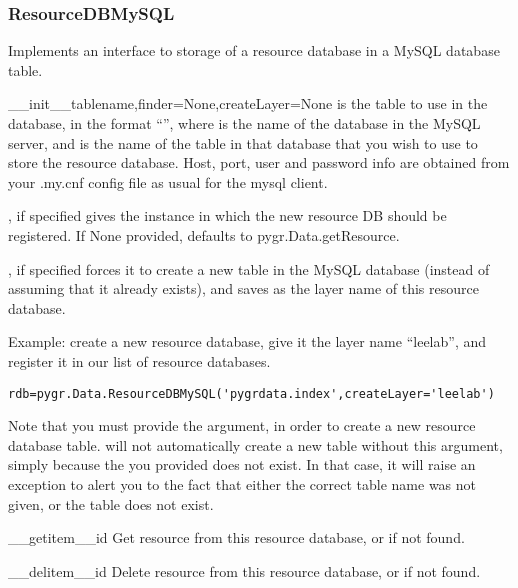 \documentclass{howto}
\begin{document}
\subsubsection{ResourceDBMySQL}
Implements an interface to storage of a resource database in a MySQL
database table.
\begin{funcdesc}{__init__}{tablename,finder=None,createLayer=None}
   is the table to use in the database, in the format
  ``'', where  is the name of the
  database in the MySQL server, and  is the name of
  the table in that database that you wish to use to store the
  resource database.  Host, port, user and password info are obtained
  from your .my.cnf config file as usual for the mysql client.

  , if specified gives the  instance
  in which the new resource DB should be registered.  If None provided,
  defaults to pygr.Data.getResource.

  , if specified forces it to create a new table
  in the MySQL database (instead of assuming that it already exists),
  and saves  as the layer name of this resource database.

  Example: create a new resource database, give it the layer name ``leelab'',
  and register it in our list of resource databases.
\begin{verbatim}
rdb=pygr.Data.ResourceDBMySQL('pygrdata.index',createLayer='leelab')
\end{verbatim}
  Note that you must provide the  argument, in order to 
  create a new resource database table.   will not
  automatically create a new table without this argument, simply because the
   you provided does not exist.  In that case, it will
  raise an exception to alert you to the fact that either the correct table name
  was not given, or the table does not exist.
\end{funcdesc}

\begin{funcdesc}{__getitem__}{id}
  Get resource  from this resource database, or  
  if not found.
\end{funcdesc}

\begin{funcdesc}{__delitem__}{id}
  Delete resource  from this resource database, or  
  if not found.
\end{funcdesc}
\end{document}
